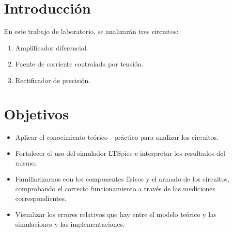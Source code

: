 \newpage
\section{Introducción}
En este trabajo de laboratorio, se analizarán tres circuitos: 
\begin{enumerate}
	\item Amplificador diferencial.
	\item Fuente de corriente controlada por tensión.
	\item Rectificador de precisión.
\end{enumerate}

\section{Objetivos}
\begin{itemize}
	\item Aplicar el conocimiento teórico - práctico para analizar los circuitos.
	\item Fortalecer el uso del simulador LTSpice e interpretar los resultados del mismo.
	\item Familiarizarnos con los componentes físicos y el armado de los circuitos, comprobando el correcto funcionamiento a través de las mediciones correspondientes.
	\item Visualizar los errores relativos que hay entre el modelo teórico y las simulaciones y las implementaciones.
	
\end{itemize}
